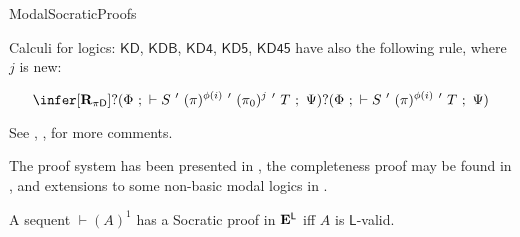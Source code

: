 \begin{entry}{ModalSocraticProofs}
\begin{calculus}
\smallskip

Calculi for logics: $\mathsf{KD}$, $\mathsf{KDB}$, $\mathsf{KD4}$, $\mathsf{KD5}$, $\mathsf{KD45}$ have also the following rule, where $j$ is new:

$$
\infer[\mathbf{R}_{\pi\mathsf{D}}]{?(\Phi ~;~ \vdash S ~'~ (\pi)^{\phi(i)} ~'~ (\pi_0)^{j} ~'~ T ~;~ \Psi)}{?(\Phi ~;~ \vdash S ~'~ (\pi)^{\phi(i)} ~'~ T ~;~ \Psi)}
$$
\end{calculus}

\begin{clarifications}
See , ,  for more comments.
\end{clarifications}

\begin{history}
The proof system has been presented in \cite{DLJ:2004}, the completeness proof may be found in \cite{DLJ:2007}, and extensions to some non-basic modal logics in \cite{DLJ:2008}.
\end{history}

\begin{technicalities}
A sequent $\vdash (A)^1$ has a Socratic proof in $\mathbf{E}^\mathsf{L}$ iff $A$ is $\mathsf{L}$-valid.
\end{technicalities}



%
%
%
%
%
%
% 
%






\end{entry}
